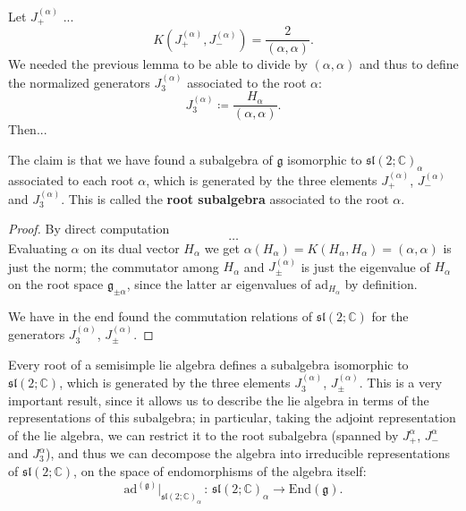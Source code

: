 \begin{lemma}
    Let \(J_+^{(\alpha)}\) ...
    \[
        K(J_+^{(\alpha)}, J_-^{(\alpha)}) = \frac{2}{(\alpha, \alpha)}.
    \]
    We needed the previous lemma to be able to divide by \((\alpha, \alpha)\) and thus to define the normalized generators \(J_{3}^{(\alpha)}\) associated to the root \(\alpha\):
    \[
        J_3^{(\alpha)}\coloneqq \frac{H_{\alpha}}{(\alpha, \alpha)}.
    \]
    Then...

    The claim is that we have found a subalgebra of \(\mathfrak{g}\) isomorphic to \(\mathfrak{sl}(2; \mathbb{C})_{\alpha}\) associated to each root \(\alpha\), which is generated by the three elements \(J_+^{(\alpha)}\), \(J_-^{(\alpha)}\) and \(J_3^{(\alpha)}\). This is called the \textbf{root subalgebra} associated to the root \(\alpha\).
\end{lemma}
\begin{proof}
    By direct computation
    \[
        \dots
    \]
    Evaluating \(\alpha\) on its dual vector \(H_{\alpha}\) we get \(\alpha(H_{\alpha}) = K(H_{\alpha}, H_{\alpha}) = (\alpha, \alpha)\) is just the norm; the commutator among \(H_{\alpha} \) and \(J_{\pm}^{(\alpha)}\) is just the eigenvalue of \(H_{\alpha}\) on the root space \(\mathfrak{g}_{\pm\alpha}\), since the latter ar eigenvalues of \(\mathrm{ad}_{H_{\alpha}}\) by definition.

    We have in the end found the commutation relations of \(\mathfrak{sl}(2; \mathbb{C})\) for the generators \(J_3^{(\alpha)}\), \(J_{\pm}^{(\alpha)}\).
\end{proof}

Every root of a semisimple lie algebra defines a subalgebra isomorphic to \(\mathfrak{sl}(2; \mathbb{C})\), which is generated by the three elements \(J_3^{(\alpha)}\), \(J_{\pm}^{(\alpha)}\). This is a very important result, since it allows us to describe the lie algebra in terms of the representations of this subalgebra; in particular, taking the adjoint representation of the lie algebra, we can restrict it to the root subalgebra (spanned by \(J_+^{\alpha}\), \(J_-^{\alpha}\) and \(J_3^{\alpha}\)), and thus we can decompose the algebra into irreducible representations of \(\mathfrak{sl}(2; \mathbb{C})\), on the space of endomorphisms of the algebra itself:
\[
    \mathrm{ad}^{(\mathfrak{g})} \big|_{\mathfrak{sl}(2; \mathbb{C})_{\alpha}} \,:\, \mathfrak{sl}(2; \mathbb{C})_{\alpha} \to \mathrm{End}(\mathfrak{g}).
\]

